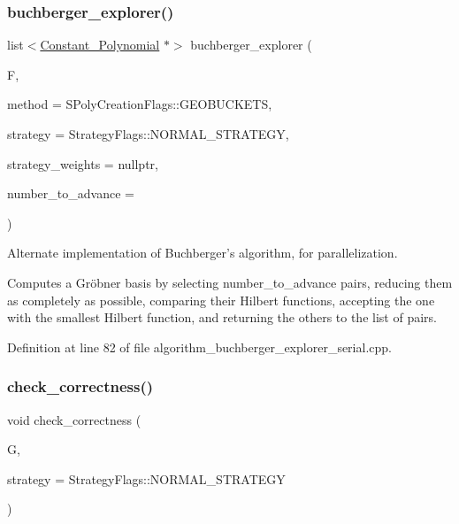 \subsubsection{\texorpdfstring{buchberger\+\_\+explorer()}{buchberger\_explorer()}\hspace{0.1cm}{\footnotesize\ttfamily [2/2]}}
{\footnotesize\ttfamily list$<$\hyperlink{group__polygroup_class_constant___polynomial}{Constant\+\_\+\+Polynomial} $\ast$$>$ buchberger\+\_\+explorer (\begin{DoxyParamCaption}\item[{const list$<$ \hyperlink{group__polygroup_class_abstract___polynomial}{Abstract\+\_\+\+Polynomial} $\ast$$>$ \&}]{F,  }\item[{\hyperlink{group___g_b_computation_ga73257b8a2d5cc826853a71b77d0cebf2}{S\+Poly\+Creation\+Flags}}]{method = {\ttfamily SPolyCreationFlags\+:\+:GEOBUCKETS},  }\item[{\hyperlink{group__strategygroup_ga0ee6c8e033547330e6b89929730007f4}{Strategy\+Flags}}]{strategy = {\ttfamily StrategyFlags\+:\+:NORMAL\+\_\+STRATEGY},  }\item[{W\+T\+\_\+\+T\+Y\+PE $\ast$}]{strategy\+\_\+weights = {\ttfamily nullptr},  }\item[{const unsigned}]{number\+\_\+to\+\_\+advance = {} }\end{DoxyParamCaption})}



Alternate implementation of Buchberger's algorithm, for parallelization. 

Computes a Gr\"{o}bner basis by selecting {\ttfamily number\+\_\+to\+\_\+advance} pairs, reducing them as completely as possible, comparing their Hilbert functions, accepting the one with the smallest Hilbert function, and returning the others to the list of pairs. 

Definition at line 82 of file algorithm\+\_\+buchberger\+\_\+explorer\+\_\+serial.\+cpp.

\mbox{\label{group___g_b_computation_gaf6fbdbd140d159527bfa757575f74560}} 
\subsubsection{\texorpdfstring{check\+\_\+correctness()}{check\_correctness()}}
{\footnotesize\ttfamily void check\+\_\+correctness (\begin{DoxyParamCaption}\item[{list$<$ \hyperlink{group__polygroup_class_constant___polynomial}{Constant\+\_\+\+Polynomial} $\ast$$>$}]{G,  }\item[{\hyperlink{group__strategygroup_ga0ee6c8e033547330e6b89929730007f4}{Strategy\+Flags}}]{strategy = {\ttfamily StrategyFlags\+:\+:NORMAL\+\_\+STRATEGY} }\end{DoxyParamCaption})}



